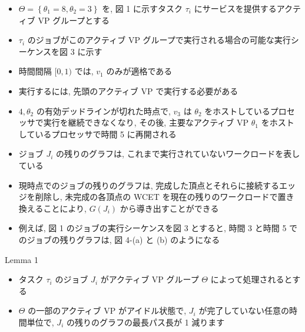 \begin{frame}{}
    \begin{itemize}
        \item $\Theta=\left\{\theta_{1}=8, \theta_{2}=3\right\}$ を, 図 1 に示すタスク $\tau_{i}$ にサービスを提供するアクティブ VP グループとする
        \item $\tau_{i}$ のジョブがこのアクティブ VP グループで実行される場合の可能な実行シーケンスを図 3 に示す
        \item 時間間隔 $[0,1)$ では, $v_{1}$ のみが適格である
        \item 実行するには, 先頭のアクティブ VP で実行する必要がある
        \item $4, \theta_{2}$ の有効デッドラインが切れた時点で, $v_{3}$ は $\theta_{2}$ をホストしているプロセッサで実行を継続できなくなり, その後, 主要なアクティブ VP $\theta_{1}$ をホストしているプロセッサで時間 5 に再開される
    \end{itemize}
\end{frame}

\begin{frame}{}
    \begin{itemize}
        \item ジョブ $J_{i}$ の残りのグラフは, これまで実行されていないワークロードを表している
        \item 現時点でのジョブの残りのグラフは, 完成した頂点とそれらに接続するエッジを削除し, 未完成の各頂点の WCET を現在の残りのワークロードで置き換えることにより, $G\left(J_{i}\right)$ から導き出すことができる
        \item 例えば, 図 1 のジョブの実行シーケンスを図 3 とすると, 時間 3 と時間 5 でのジョブの残りグラフは, 図 4-(a) と (b) のようになる
    \end{itemize}
\end{frame}

\begin{frame}[label=lemma1]{Lemma 1}
    \begin{lemma}[]
        \begin{itemize}
            \item タスク $\tau_{i}$ のジョブ $J_{i}$ がアクティブ VP グループ $\Theta$ によって処理されるとする
            \item $\Theta$ の一部のアクティブ VP がアイドル状態で, $J_{i}$ が完了していない任意の時間単位で,  $J_{i}$ の残りのグラフの最長パス長が 1 減ります
        \end{itemize}
    \end{lemma}
\end{frame}

